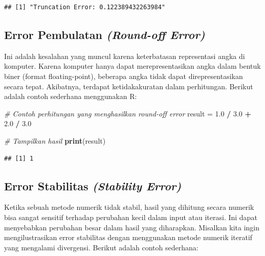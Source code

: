 \documentclass[
]{book}
\newenvironment{Shaded}{\begin{snugshade}}{\end{snugshade}}
\newcommand{\CommentTok}[1]{\textcolor[rgb]{0.56,0.35,0.01}{\textit{#1}}}
\newcommand{\FloatTok}[1]{\textcolor[rgb]{0.00,0.00,0.81}{#1}}
\newcommand{\FunctionTok}[1]{\textcolor[rgb]{0.13,0.29,0.53}{\textbf{#1}}}
\newcommand{\NormalTok}[1]{#1}
\newcommand{\OtherTok}[1]{\textcolor[rgb]{0.56,0.35,0.01}{#1}}
\newcommand{\SpecialCharTok}[1]{\textcolor[rgb]{0.81,0.36,0.00}{\textbf{#1}}}
\theoremstyle{definition}
\theoremstyle{definition}
\theoremstyle{definition}
\theoremstyle{definition}
\theoremstyle{remark}
\begin{document}
\begin{verbatim}
## [1] "Truncation Error: 0.122389432263984"
\end{verbatim}

\hypertarget{error-pembulatan-round-off-error}{%
\subsection{\texorpdfstring{Error Pembulatan \emph{(Round-off Error)}}{Error Pembulatan (Round-off Error)}}\label{error-pembulatan-round-off-error}}

Ini adalah kesalahan yang muncul karena keterbatasan representasi angka di komputer. Karena komputer hanya dapat merepresentasikan angka dalam bentuk biner (format floating-point), beberapa angka tidak dapat direpresentasikan secara tepat. Akibatnya, terdapat ketidakakuratan dalam perhitungan. Berikut adalah contoh sederhana menggunakan R:

\begin{Shaded}
\begin{Highlighting}[]
\CommentTok{\# Contoh perhitungan yang menghasilkan round{-}off error}
\NormalTok{result }\OtherTok{=} \FloatTok{1.0} \SpecialCharTok{/} \FloatTok{3.0} \SpecialCharTok{+} \FloatTok{2.0} \SpecialCharTok{/} \FloatTok{3.0}

\CommentTok{\# Tampilkan hasil}
\FunctionTok{print}\NormalTok{(result)}
\end{Highlighting}
\end{Shaded}

\begin{verbatim}
## [1] 1
\end{verbatim}

\hypertarget{error-stabilitas-stability-error}{%
\subsection{\texorpdfstring{Error Stabilitas \emph{(Stability Error)}}{Error Stabilitas (Stability Error)}}\label{error-stabilitas-stability-error}}

Ketika sebuah metode numerik tidak stabil, hasil yang dihitung secara numerik bisa sangat sensitif terhadap perubahan kecil dalam input atau iterasi. Ini dapat menyebabkan perubahan besar dalam hasil yang diharapkan. Misalkan kita ingin mengilustrasikan error stabilitas dengan menggunakan metode numerik iteratif yang mengalami divergensi. Berikut adalah contoh sederhana:
\end{document}
